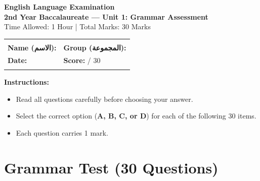 \documentclass[11pt, a4paper]{article}
\begin{document}
\begin{center}
    {\LARGE \bfseries English Language Examination}\\[0.5em]
    {\large \bfseries 2nd Year Baccalaureate --- Unit 1: Grammar Assessment}\\[0.3em]
    {\small Time Allowed: 1 Hour | Total Marks: 30 Marks}
\end{center}

\vspace{0.5cm}

\noindent
\begin{tabular}{|p{}|p{}|}
    \hline
    & \\
    \textbf{Name (الاسم):} \dotfill & \textbf{Group (المجموعة):} \dotfill \\[0.8em]
    \textbf{Date:} \dotfill & \textbf{Score:} \quad \quad / 30 \\
    & \\
    \hline
\end{tabular}

\vspace{0.8cm}

\noindent\textbf{\large Instructions:}
\begin{itemize}[leftmargin=1.5em, itemsep=2pt]
    \item Read all questions carefully before choosing your answer.
    \item Select the correct option (\textbf{A, B, C, or D}) for each of the following 30 items.
    \item Each question carries 1 mark.
\end{itemize}

\vspace{0.5cm}

\section*{Grammar Test (30 Questions)}
\end{document}
